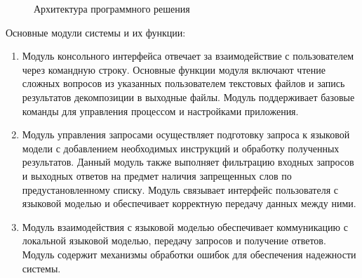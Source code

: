 \begin{figure}[H]
	\centering
	\caption{Архитектура программного решения}
	\label{fig:constr_architecture}
\end{figure}

Основные модули системы и их функции:

\begin{enumerate}
	\item Модуль консольного интерфейса отвечает за взаимодействие с пользователем через командную строку. Основные функции модуля включают чтение сложных вопросов из указанных пользователем текстовых файлов и запись результатов декомпозиции в выходные файлы. Модуль поддерживает базовые команды для управления процессом и настройками приложения.

	\item Модуль управления запросами осуществляет подготовку запроса к языковой модели с добавлением необходимых инструкций и обработку полученных результатов. Данный модуль также выполняет фильтрацию входных запросов и выходных ответов на предмет наличия запрещенных слов по предустановленному списку. Модуль связывает интерфейс пользователя с языковой моделью и обеспечивает корректную передачу данных между ними.

	\item Модуль взаимодействия с языковой моделью обеспечивает коммуникацию с локальной языковой моделью, передачу запросов и получение ответов. Модуль содержит механизмы обработки ошибок для обеспечения надежности системы.
\end{enumerate}

